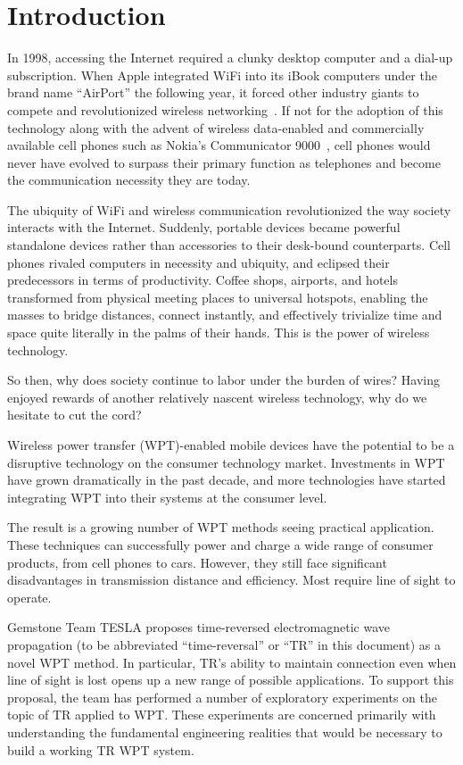 \chapter{Introduction}
\label{ch:introduction}

In 1998, accessing the Internet required a clunky desktop computer and a dial-up subscription. When Apple integrated WiFi into its iBook computers under the brand name ``AirPort'' the following year, it forced other industry giants to compete and revolutionized wireless networking~\cite{_brief_2004}. If not for the adoption of this technology along with the advent of wireless data-enabled and commercially available cell phones such as Nokia's Communicator 9000~\cite{_first_1996}, cell phones would never have evolved to surpass their primary function as telephones and become the communication necessity they are today.

The ubiquity of WiFi and wireless communication revolutionized the way society interacts with the Internet. Suddenly, portable devices became powerful standalone devices rather than accessories to their desk-bound counterparts. Cell phones rivaled computers in necessity and ubiquity, and eclipsed their predecessors in terms of productivity. Coffee shops, airports, and hotels transformed from physical meeting places to universal hotspots, enabling the masses to bridge distances, connect instantly, and effectively trivialize time and space quite literally in the palms of their hands. This is the power of wireless technology.

So then, why does society continue to labor under the burden of wires? Having enjoyed rewards of another relatively nascent wireless technology, why do we hesitate to cut the cord?

Wireless power transfer (WPT)-enabled mobile devices have the potential to be a disruptive technology on the consumer technology market. Investments in WPT have grown dramatically in the past decade, and more technologies have started integrating WPT into their systems at the consumer level.

The result is a growing number of WPT methods seeing practical application. These techniques can successfully power and charge a wide range of consumer products, from cell phones to cars. However, they still face significant disadvantages in transmission distance and efficiency. Most require line of sight to operate.

Gemstone Team TESLA proposes time-reversed electromagnetic wave propagation (to be abbreviated ``time-reversal'' or ``TR'' in this document) as a novel WPT method. In particular, TR's ability to maintain connection even when line of sight is lost opens up a new range of possible applications. To support this proposal, the team has performed a number of exploratory experiments on the topic of TR applied to WPT.  These experiments are concerned primarily with understanding the fundamental engineering realities that would be necessary to build a working TR WPT system.


